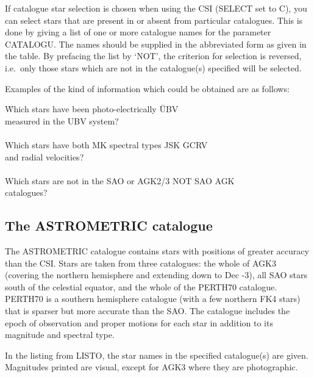 \documentclass{article}
\begin{document}
If catalogue star selection is chosen when using the CSI (SELECT set to C),
you can select stars that are present in or absent from particular catalogues.
This is done by giving a list of one or more catalogue names for the parameter
CATALOGU.
The names should be supplied in the abbreviated form as given in the table.
By prefacing the list by `NOT', the criterion for selection is reversed,
i.e.\ only those stars which are not in the catalogue(s) specified will be
selected.

Examples of the kind of information which could be obtained are as follows:

\begin{tabbing}
\hspace{10mm}\=Which stars have been photo-electrically \hspace{10mm}\=UBV\\
\>measured in the UBV system?\\ \\

\>Which stars have both MK spectral types \>JSK GCRV \\
\>and radial velocities? \\ \\

\>Which stars are not in the SAO or AGK2/3 \>NOT SAO AGK \\
\>catalogues?
\end{tabbing}

\subsection{The ASTROMETRIC catalogue}
The ASTROMETRIC catalogue contains stars with positions of greater accuracy than
the CSI.
Stars are taken from three catalogues:
the whole of AGK3 (covering the northern hemisphere and extending down to Dec
-3), all SAO stars south of the celestial equator, and the whole of the PERTH70
catalogue.
PERTH70 is a southern hemisphere catalogue (with a few northern FK4 stars) that
is sparser but more accurate than the SAO.
The catalogue includes the epoch of observation and proper motions for each star
in addition to its magnitude and spectral type.

In the listing from LISTO, the star names in the specified catalogue(s) are
given.
Magnitudes printed are visual, except for AGK3 where they are photographic.
\end{document}
